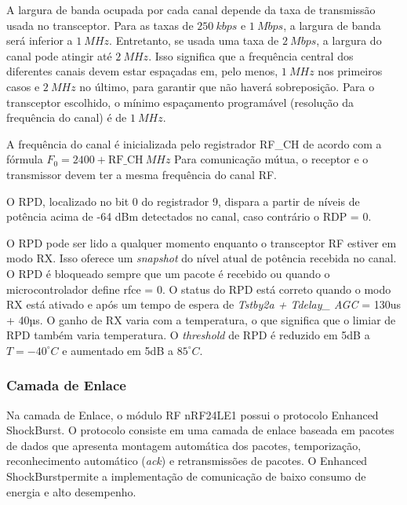 A largura de banda ocupada por cada canal depende da taxa de transmissão usada no transceptor. Para as taxas de $250~kbps$ e $1~Mbps$, a largura de banda será inferior a $1~MHz$. Entretanto, se usada uma taxa de $2~Mbps$, a largura do canal pode atingir até $2~MHz$. Isso significa que a frequência central dos diferentes canais devem estar espaçadas em, pelo menos, $1~MHz$ nos primeiros casos e $2~MHz$ no último, para garantir que não haverá sobreposição. Para o transceptor escolhido, o mínimo espaçamento programável (resolução da frequência do canal) é de $1~MHz$.


A frequência do canal é inicializada pelo registrador RF\_{CH} de acordo com a fórmula 
$F_0= 2400 + \text{RF\_{CH}}~MHz$
Para comunicação mútua, o receptor e o transmissor devem ter a mesma frequência do canal RF.


O RPD, localizado no bit 0 do registrador 9, dispara a partir de níveis de potência acima de -64 dBm detectados no canal, caso contrário o RDP = 0.

O RPD pode ser lido a qualquer momento enquanto o transceptor RF estiver em modo RX. Isso oferece um \emph{snapshot} do nível atual de potência recebida no canal. O RPD é bloqueado sempre que um pacote é recebido ou 
quando o microcontrolador define rfce = 0. O status do RPD está correto quando o modo RX está ativado e após um tempo de espera de \emph{Tstby2a + Tdelay\_ AGC} = 130us + 40µs. O ganho de RX varia com a temperatura, o que significa que o limiar de RPD também varia temperatura. O \emph{threshold} de RPD é reduzido em 5dB a $T = -40^{\circ}C$ e aumentado em 5dB a $85 ^{\circ}C$.

\subsubsection{Camada de Enlace}

Na camada de Enlace, o módulo RF nRF24LE1 possui o protocolo Enhanced ShockBurst\texttrademark. O protocolo consiste em uma camada de enlace baseada em pacotes de dados que apresenta montagem automática dos pacotes,
temporização, reconhecimento automático (\emph{ack}) e retransmissões de pacotes. O Enhanced ShockBurst\texttrademark permite a implementação de comunicação de baixo consumo de energia e alto desempenho.

